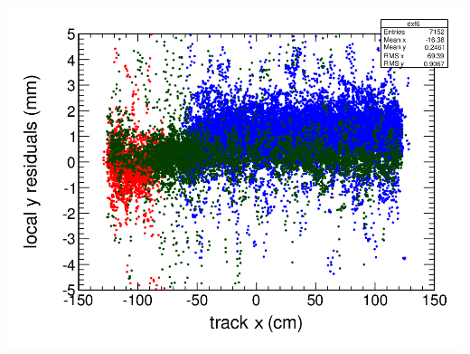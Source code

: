\documentclass[compress]{beamer}
\begin{document}
\begin{frame}
\begin{columns}
\vspace{0.25 cm}
\includegraphics[width=\linewidth]{residuals_in_chamber.png}
\end{columns}
\end{frame}
\end{document}
